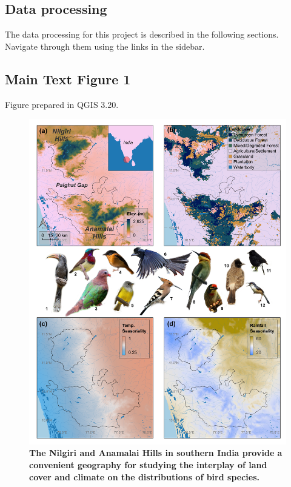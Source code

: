 \documentclass[
]{article}
\begin{document}
\hypertarget{data-processing}{%
\subsection{Data processing}\label{data-processing}}

The data processing for this project is described in the following sections. Navigate through them using the links in the sidebar.

\hypertarget{main-text-figure-1}{%
\subsection{Main Text Figure 1}\label{main-text-figure-1}}

Figure prepared in QGIS 3.20.

\begin{figure}
\centering
\includegraphics{figs/fig_01.png}
\caption{\textbf{The Nilgiri and Anamalai Hills in southern India provide a convenient geography for studying the interplay of land cover and climate on the distributions of bird species.}
}
\end{figure}
\end{document}
